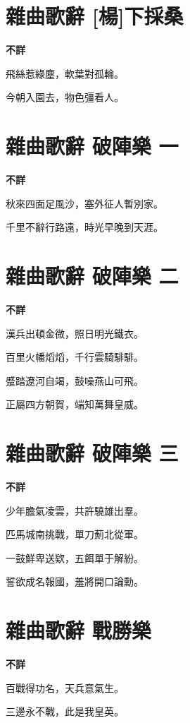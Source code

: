 \documentclass[12pt,a4paper]{ctexbook}
\begin{document}
\section{雜曲歌辭 [楊]下採桑}
\textbf{不詳}\par\vspace{0.5em}
飛絲惹綠塵，軟葉對孤輪。\par
今朝入園去，物色彊看人。\par

\section{雜曲歌辭 破陣樂 一}
\textbf{不詳}\par\vspace{0.5em}
秋來四面足風沙，塞外征人暫別家。\par
千里不辭行路遠，時光早晚到天涯。\par

\section{雜曲歌辭 破陣樂 二}
\textbf{不詳}\par\vspace{0.5em}
漢兵出頓金微，照日明光鐵衣。\par
百里火幡熖熖，千行雲騎騑騑。\par
蹙踏遼河自竭，鼓噪燕山可飛。\par
正屬四方朝賀，端知萬舞皇威。\par

\section{雜曲歌辭 破陣樂 三}
\textbf{不詳}\par\vspace{0.5em}
少年膽氣凌雲，共許驍雄出羣。\par
匹馬城南挑戰，單刀薊北從軍。\par
一鼓鮮卑送欵，五餌單于解紛。\par
誓欲成名報國，羞將開口論勳。\par

\section{雜曲歌辭 戰勝樂}
\textbf{不詳}\par\vspace{0.5em}
百戰得功名，天兵意氣生。\par
三邊永不戰，此是我皇英。\par
\end{document}
